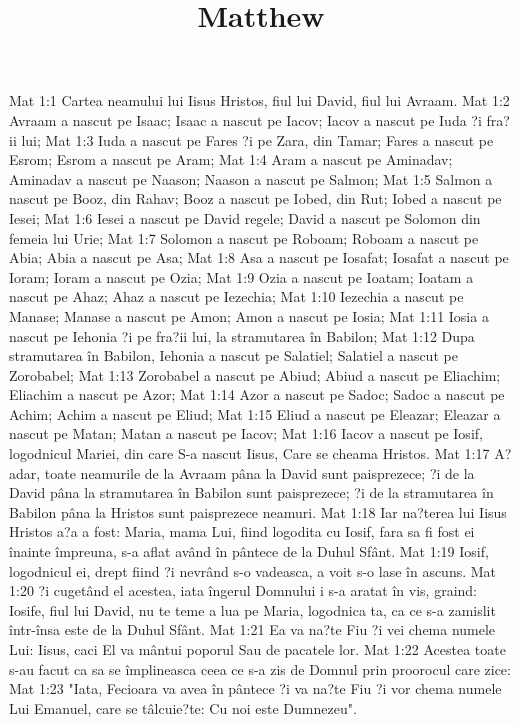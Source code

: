 

\title{Matthew}

Mat 1:1  Cartea neamului lui Iisus Hristos, fiul lui David, fiul lui Avraam.
Mat 1:2  Avraam a nascut pe Isaac; Isaac a nascut pe Iacov; Iacov a nascut pe Iuda ?i fra?ii lui;
Mat 1:3  Iuda a nascut pe Fares ?i pe Zara, din Tamar; Fares a nascut pe Esrom; Esrom a nascut pe Aram;
Mat 1:4  Aram a nascut pe Aminadav; Aminadav a nascut pe Naason; Naason a nascut pe Salmon;
Mat 1:5  Salmon a nascut pe Booz, din Rahav; Booz a nascut pe Iobed, din Rut; Iobed a nascut pe Iesei;
Mat 1:6  Iesei a nascut pe David regele; David a nascut pe Solomon din femeia lui Urie;
Mat 1:7  Solomon a nascut pe Roboam; Roboam a nascut pe Abia; Abia a nascut pe Asa;
Mat 1:8  Asa a nascut pe Iosafat; Iosafat a nascut pe Ioram; Ioram a nascut pe Ozia;
Mat 1:9  Ozia a nascut pe Ioatam; Ioatam a nascut pe Ahaz; Ahaz a nascut pe Iezechia;
Mat 1:10  Iezechia a nascut pe Manase; Manase a nascut pe Amon; Amon a nascut pe Iosia;
Mat 1:11  Iosia a nascut pe Iehonia ?i pe fra?ii lui, la stramutarea în Babilon;
Mat 1:12  Dupa stramutarea în Babilon, Iehonia a nascut pe Salatiel; Salatiel a nascut pe Zorobabel;
Mat 1:13  Zorobabel a nascut pe Abiud; Abiud a nascut pe Eliachim; Eliachim a nascut pe Azor;
Mat 1:14  Azor a nascut pe Sadoc; Sadoc a nascut pe Achim; Achim a nascut pe Eliud;
Mat 1:15  Eliud a nascut pe Eleazar; Eleazar a nascut pe Matan; Matan a nascut pe Iacov;
Mat 1:16  Iacov a nascut pe Iosif, logodnicul Mariei, din care S-a nascut Iisus, Care se cheama Hristos.
Mat 1:17  A?adar, toate neamurile de la Avraam pâna la David sunt paisprezece; ?i de la David pâna la stramutarea în Babilon sunt paisprezece; ?i de la stramutarea în Babilon pâna la Hristos sunt paisprezece neamuri.
Mat 1:18  Iar na?terea lui Iisus Hristos a?a a fost: Maria, mama Lui, fiind logodita cu Iosif, fara sa fi fost ei înainte împreuna, s-a aflat având în pântece de la Duhul Sfânt.
Mat 1:19  Iosif, logodnicul ei, drept fiind ?i nevrând s-o vadeasca, a voit s-o lase în ascuns.
Mat 1:20  ?i cugetând el acestea, iata îngerul Domnului i s-a aratat în vis, graind: Iosife, fiul lui David, nu te teme a lua pe Maria, logodnica ta, ca ce s-a zamislit într-însa este de la Duhul Sfânt.
Mat 1:21  Ea va na?te Fiu ?i vei chema numele Lui: Iisus, caci El va mântui poporul Sau de pacatele lor.
Mat 1:22  Acestea toate s-au facut ca sa se împlineasca ceea ce s-a zis de Domnul prin proorocul care zice:
Mat 1:23  "Iata, Fecioara va avea în pântece ?i va na?te Fiu ?i vor chema numele Lui Emanuel, care se tâlcuie?te: Cu noi este Dumnezeu".
